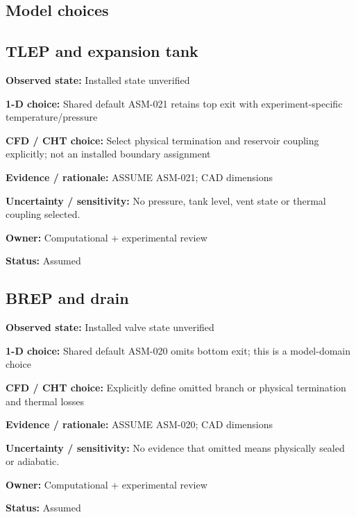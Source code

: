 \documentclass[11pt]{article}
\begin{document}
\subsection{Model choices}
\par\noindent\begin{minipage}{\textwidth}\small\setlength{\parskip}{2pt}
\subsection*{TLEP and expansion tank}
\textbf{Observed state:} Installed state unverified\par
\textbf{1-D choice:} Shared default ASM-021 retains top exit with experiment-specific temperature/pressure\par
\textbf{CFD / CHT choice:} Select physical termination and reservoir coupling explicitly; not an installed boundary assignment\par
\textbf{Evidence / rationale:} ASSUME ASM-021; CAD dimensions\par
\textbf{Uncertainty / sensitivity:} No pressure, tank level, vent state or thermal coupling selected.\par
\textbf{Owner:} Computational + experimental review\par
\textbf{Status:} Assumed\par
\end{minipage}\par\vspace{5pt}
\par\noindent\begin{minipage}{\textwidth}\small\setlength{\parskip}{2pt}
\subsection*{BREP and drain}
\textbf{Observed state:} Installed valve state unverified\par
\textbf{1-D choice:} Shared default ASM-020 omits bottom exit; this is a model-domain choice\par
\textbf{CFD / CHT choice:} Explicitly define omitted branch or physical termination and thermal losses\par
\textbf{Evidence / rationale:} ASSUME ASM-020; CAD dimensions\par
\textbf{Uncertainty / sensitivity:} No evidence that omitted means physically sealed or adiabatic.\par
\textbf{Owner:} Computational + experimental review\par
\textbf{Status:} Assumed\par
\end{minipage}\par\vspace{5pt}
\end{document}
